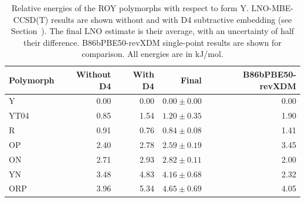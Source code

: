\begin{table}[h]
\centering

\caption{\label{tab:roy_polymorph_relative_energies}Relative energies of the ROY polymorphs with respect to form Y. LNO-MBE-CCSD(T) results are shown without and with D4 subtractive embedding (see Section~). The final LNO estimate is their average, with an uncertainty of half their difference. B86bPBE50-revXDM single-point results are shown for comparison. All energies are in kJ/mol.}
\begin{tabular}{lrrrr}
\toprule
Polymorph & Without D4 & With D4 & Final & B86bPBE50-revXDM \\ 
\midrule
Y & 0.00 & 0.00 & $0.00 \pm 0.00$ & 0.00 \\
YT04 & 0.85 & 1.54 & $1.20 \pm 0.35$ & 1.90 \\
R & 0.91 & 0.76 & $0.84 \pm 0.08$ & 1.41 \\
OP & 2.40 & 2.78 & $2.59 \pm 0.19$ & 3.45 \\
ON & 2.71 & 2.93 & $2.82 \pm 0.11$ & 2.00 \\
YN & 3.48 & 4.83 & $4.16 \pm 0.68$ & 2.32 \\
ORP & 3.96 & 5.34 & $4.65 \pm 0.69$ & 4.05 \\
\bottomrule
\end{tabular}

\end{table}